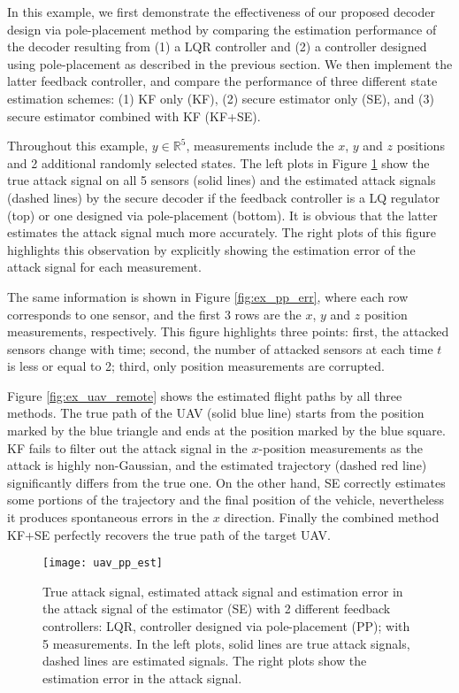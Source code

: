\documentclass[journal]{IEEEtran}
\begin{document}
In this example, we first demonstrate the effectiveness of our proposed decoder design via pole-placement method by comparing the estimation performance of the decoder resulting from (1) a LQR controller and (2) a controller designed using pole-placement as described in the previous section.
We then implement the latter feedback controller, and compare the performance of three different state estimation schemes: (1) KF only (KF), (2) secure estimator only (SE), and (3) secure estimator combined with KF (KF+SE). 

Throughout this example, $y \in \mathbb{R}^5$, measurements include the $x$, $y$ and $z$ positions and 2 additional randomly selected states. The left plots in Figure \ref{fig:ex_pp_est} show the true attack signal on all 5 sensors (solid lines) and the estimated attack signals (dashed lines) by the secure decoder if the feedback controller is a LQ regulator (top) or one designed via pole-placement (bottom). It is obvious that the latter estimates the attack signal much more accurately. The right plots of this figure highlights this observation by explicitly showing the estimation error of the attack signal for each measurement.

The same information is shown in Figure \ref{fig:ex_pp_err}, where each row corresponds to one sensor, and the first 3 rows are the $x$, $y$ and $z$ position measurements, respectively. This figure highlights three points: first, the attacked sensors change with time; second, the number of attacked sensors at each time $t$ is less or equal to 2; third, only position measurements are corrupted.

Figure \ref{fig:ex_uav_remote} shows the estimated flight paths by all three methods.
The true path of the UAV (solid blue line) starts from the position marked by the blue triangle and ends at the position marked by the blue square. KF fails to filter out the attack signal in the $x$-position measurements as the attack is highly non-Gaussian, and the estimated trajectory (dashed red line) significantly differs from the true one. On the other hand, SE correctly estimates some portions of the trajectory and the final position of the vehicle, nevertheless it produces spontaneous errors in the $x$ direction. 
Finally the combined method KF+SE perfectly recovers the true path of the target UAV.


\begin{figure}
\center
\texttt{[image: uav\_pp\_est]}
\caption{True attack signal, estimated attack signal and estimation error in the attack signal of the estimator (SE) with 2 different feedback controllers: LQR, controller designed via pole-placement (PP); with 5 measurements. In the left plots, solid lines are true attack signals, dashed lines are estimated signals. The right plots show the estimation error in the attack signal.}
\label{fig:ex_pp_est}
\end{figure}
\end{document}
